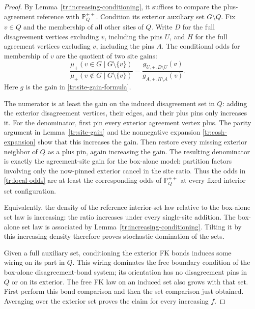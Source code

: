 \documentclass[11pt]{article}
\theoremstyle{definition}
\theoremstyle{remark}
\numberwithin{equation}{section}
\begin{document}
\begin{proof}
By Lemma~\ref{tr:increasing-conditioning}, it suffices to compare the
plus-agreement reference with $\mathbb P_Q^{++}$. Condition its exterior
auxiliary set $G\setminus Q$. Fix $v\in Q$ and the membership of all other
sites of $Q$. Write $D$ for the full disagreement vertices excluding $v$,
including the pins $U$, and $H$ for the full agreement vertices excluding
$v$, including the pins $A$. The conditional odds for membership of $v$
are the quotient of two site gains:
\begin{equation}
\label{tr:local-odds}
 \frac{\mu_+(v\in G\mid G\setminus\{v\})}
 {\mu_+(v\notin G\mid G\setminus\{v\})}
 =\frac{g_{U,+,D\setminus U}(v)}
             {g_{A,+,H\setminus A}(v)}.
\end{equation}
Here $g$ is the gain in \eqref{tr:site-gain-formula}.

The numerator is at least the gain on the induced disagreement set in
$Q$: adding the exterior disagreement vertices, their edges, and their
plus pins only increases it. For the denominator, first pin every exterior
agreement vertex plus. The parity argument in Lemma~\ref{tr:site-gain}
and the nonnegative expansion \eqref{tr:cosh-expansion} show that this
increases the gain. Then restore every missing exterior neighbor of $Q$
as a plus pin, again increasing the gain. The resulting denominator is
exactly the agreement-site gain for the box-alone model: partition
factors involving only the now-pinned exterior cancel in the site ratio.
Thus the odds
in \eqref{tr:local-odds} are at least the corresponding odds of
$\mathbb P_Q^{++}$ at every fixed interior set configuration.

Equivalently, the density of the reference interior-set law relative to
the box-alone set law is increasing: the ratio increases under every
single-site addition. The box-alone set law is associated by
Lemma~\ref{tr:increasing-conditioning}. Tilting it by this increasing
density therefore proves stochastic domination of the sets.

Given a full auxiliary set, conditioning the exterior FK bonds induces
some wiring on its part in $Q$. This wiring dominates the free boundary
condition of the box-alone disagreement-bond system; its orientation has
no disagreement pins in $Q$ or on its exterior. The free FK law on an
induced set also grows with that set. First perform this bond comparison
and then the set comparison just obtained. Averaging over the exterior
set proves the claim for every increasing $f$.
\end{proof}
\end{document}
